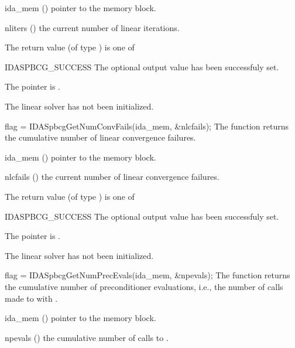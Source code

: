 {
  \begin{args}[nliters]
  \item[ida\_mem] ()
    pointer to the {\ida} memory block.
  \item[nliters] ()
    the current number of linear iterations.
  \end{args}
}
{
  The return value  (of type ) is one of
  \begin{args}
  \item[IDASPBCG\_SUCCESS] 
    The optional output value has been successfuly set.
  \item[\Id{IDASPBCG\_MEM\_NULL}]
    The  pointer is .
  \item[\Id{IDASPBCG\_LMEM\_NULL}]
    The {\idaspbcg} linear solver has not been initialized.
  \end{args}
}
{}
{
  flag = IDASpbcgGetNumConvFails(ida\_mem, \&nlcfails);
}
{
  The function  returns the
  cumulative number of linear convergence failures.
}
{
  \begin{args}[nlcfails]
  \item[ida\_mem] ()
    pointer to the {\ida} memory block.
  \item[nlcfails] ()
    the current number of linear convergence failures.
  \end{args}
}
{
  The return value  (of type ) is one of
  \begin{args}
  \item[IDASPBCG\_SUCCESS] 
    The optional output value has been successfuly set.
  \item[\Id{IDASPBCG\_MEM\_NULL}]
    The  pointer is .
  \item[\Id{IDASPBCG\_LMEM\_NULL}]
    The {\idaspbcg} linear solver has not been initialized.
  \end{args}
}
{}
{
  flag = IDASpbcgGetNumPrecEvals(ida\_mem, \&npevals);
}
{
  The function  returns the
  cumulative number of preconditioner evaluations, i.e., the number of 
  calls made to  with .
}
{
  \begin{args}[npevals]
  \item[ida\_mem] ()
    pointer to the {\ida} memory block.
  \item[npevals] ()
    the cumulative number of calls to .
  \end{args}
}
